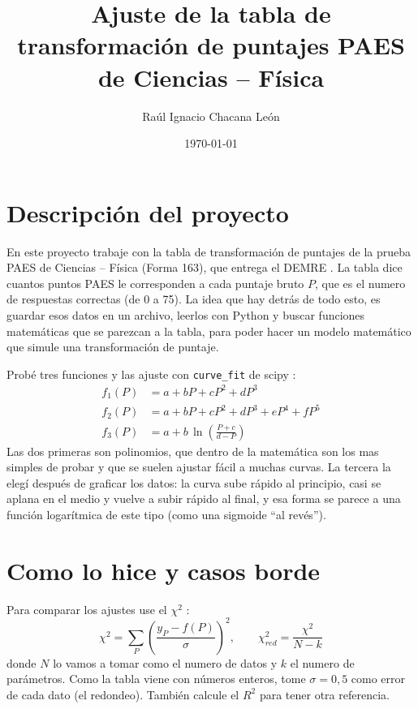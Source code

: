 \documentclass[10pt,a4paper]{article}
\title{Ajuste de la tabla de transformación de puntajes PAES\\ de Ciencias -- Física}
\author{Raúl Ignacio Chacana León}
\date{\today}
\begin{document}
\maketitle

\section{Descripción del proyecto}
En este proyecto trabaje con la tabla de transformación de puntajes de la prueba PAES de Ciencias -- Física (Forma 163), que entrega el DEMRE \cite{demre2026}. La tabla dice cuantos puntos PAES le corresponden a cada puntaje bruto $P$, que es el numero de respuestas correctas (de 0 a 75). La idea que hay detrás de todo esto, es guardar esos datos en un archivo, leerlos con Python y buscar funciones matemáticas que se parezcan a la tabla, para poder hacer un modelo matemático que simule una transformación de puntaje.

Probé tres funciones y las ajuste con \texttt{curve\_fit} de scipy \cite{virtanen2020}:
\begin{align}
f_1(P) &= a + bP + cP^2 + dP^3 \label{eq:p3}\\
f_2(P) &= a + bP + cP^2 + dP^3 + eP^4 + fP^5 \label{eq:p5}\\
f_3(P) &= a + b\,\ln\!\left(\frac{P + c}{d - P}\right) \label{eq:logit}
\end{align}
Las dos primeras son polinomios, que dentro de la matemática son los mas simples de probar y que se suelen ajustar fácil a muchas curvas. La tercera la elegí después de graficar los datos: la curva sube rápido al principio, casi se aplana en el medio y vuelve a subir rápido al final, y esa forma se parece a una función logarítmica de este tipo (como una sigmoide ``al revés'').

\section{Como lo hice y casos borde}
Para comparar los ajustes use el $\chi^2$ \cite{bevington2003}:
\begin{equation}
\chi^2 = \sum_{P} \left(\frac{y_P - f(P)}{\sigma}\right)^2 , \qquad \chi^2_{red} = \frac{\chi^2}{N - k}
\end{equation}
donde $N$ lo vamos a tomar como el numero de datos y $k$ el numero de parámetros. Como la tabla viene con números enteros, tome $\sigma = 0{,}5$ como error de cada dato (el redondeo). También calcule el $R^2$ para tener otra referencia.
\end{document}
